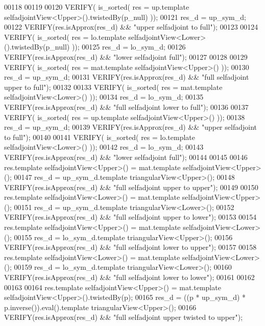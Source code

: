 \begin{DoxyCode}
00118   
00119   
00120   VERIFY( is\_sorted( res = up.template selfadjointView<Upper>().twistedBy(p\_null) ));
00121   res\_d = up\_sym\_d;
00122   VERIFY(res.isApprox(res\_d) && \textcolor{stringliteral}{"upper selfadjoint to full"});
00123   
00124   VERIFY( is\_sorted( res = lo.template selfadjointView<Lower>().twistedBy(p\_null) ));
00125   res\_d = lo\_sym\_d;
00126   VERIFY(res.isApprox(res\_d) && \textcolor{stringliteral}{"lower selfadjoint full"});
00127 
00128 
00129   VERIFY( is\_sorted( res = mat.template selfadjointView<Upper>() ));
00130   res\_d = up\_sym\_d;
00131   VERIFY(res.isApprox(res\_d) && \textcolor{stringliteral}{"full selfadjoint upper to full"});
00132 
00133   VERIFY( is\_sorted( res = mat.template selfadjointView<Lower>() ));
00134   res\_d = lo\_sym\_d;
00135   VERIFY(res.isApprox(res\_d) && \textcolor{stringliteral}{"full selfadjoint lower to full"});
00136 
00137   VERIFY( is\_sorted( res = up.template selfadjointView<Upper>() ));
00138   res\_d = up\_sym\_d;
00139   VERIFY(res.isApprox(res\_d) && \textcolor{stringliteral}{"upper selfadjoint to full"});
00140 
00141   VERIFY( is\_sorted( res = lo.template selfadjointView<Lower>() ));
00142   res\_d = lo\_sym\_d;
00143   VERIFY(res.isApprox(res\_d) && \textcolor{stringliteral}{"lower selfadjoint full"});
00144 
00145 
00146   res.template selfadjointView<Upper>() = mat.template selfadjointView<Upper>();
00147   res\_d = up\_sym\_d.template triangularView<Upper>();
00148   VERIFY(res.isApprox(res\_d) && \textcolor{stringliteral}{"full selfadjoint upper to upper"});
00149 
00150   res.template selfadjointView<Lower>() = mat.template selfadjointView<Upper>();
00151   res\_d = up\_sym\_d.template triangularView<Lower>();
00152   VERIFY(res.isApprox(res\_d) && \textcolor{stringliteral}{"full selfadjoint upper to lower"});
00153 
00154   res.template selfadjointView<Upper>() = mat.template selfadjointView<Lower>();
00155   res\_d = lo\_sym\_d.template triangularView<Upper>();
00156   VERIFY(res.isApprox(res\_d) && \textcolor{stringliteral}{"full selfadjoint lower to upper"});
00157 
00158   res.template selfadjointView<Lower>() = mat.template selfadjointView<Lower>();
00159   res\_d = lo\_sym\_d.template triangularView<Lower>();
00160   VERIFY(res.isApprox(res\_d) && \textcolor{stringliteral}{"full selfadjoint lower to lower"});
00161 
00162   
00163   
00164   res.template selfadjointView<Upper>() = mat.template selfadjointView<Upper>().twistedBy(p);
00165   res\_d = ((p * up\_sym\_d) * p.inverse()).eval().template triangularView<Upper>();
00166   VERIFY(res.isApprox(res\_d) && \textcolor{stringliteral}{"full selfadjoint upper twisted to upper"});

\end{DoxyCode}
